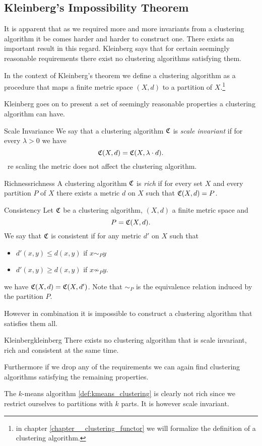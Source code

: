 \subsection[Kleinberg's Impossibility Theorem]{Kleinberg's Impossibility Theorem \cite{Kleinberg2002}}
It is apparent that as we required more and more invariants from a clustering algorithm it be comes harder and harder to construct one.
There exists an important result in this regard. Kleinberg says that for certain seemingly reasonable requirements there exist no clustering algorithms satisfying them.

In the context of Kleinberg's theorem we define a clustering algorithm as a procedure that maps a finite metric space $(X,d)$ to a partition of $X$.\footnote{in chapter \ref{chapter__clustering_functor} we will formalize the definition of a clustering algorithm.}

Kleinberg goes on to present a set of seemingly reasonable properties a clustering algorithm can have.

\begin{definition}{Scale Invariance}{}
We say that a clustering algorithm $\mathfrak{C}$ is \emph{scale invariant} if for every $\lambda > 0$ we have
$$
\mathfrak{C}(X,d) = \mathfrak{C}(X, \lambda \cdot d).
$$
\Ie\ re scaling the metric does not affect the clustering algorithm.
\end{definition}

\begin{definition}{Richness}{richness}
A clustering algorithm $\mathfrak{C}$ is \emph{rich} if for every set $X$ and every partition $P$ of $X$ there exists a metric $d$ on $X$ such that $\mathfrak{C}(X,d) = P$.
\end{definition}

\begin{definition}{Consistency}{}
Let $\mathfrak{C}$ be a clustering algorithm, $(X,d)$ a finite metric space and
$$
P = \mathfrak{C}(X,d).
$$
We say that $\mathfrak{C}$ is consistent if for any metric $d'$ on $X$ such that
\begin{itemize}
    \item $d'(x,y) \leq d(x,y)$ if $x\sim_P y$
    
    \item $d'(x,y) \geq d(x,y)$ if $x \not\sim_P y$.
\end{itemize}
we have $\mathfrak{C}(X,d) = \mathfrak{C}(X,d')$. Note that $\sim_P$ is the equivalence relation induced by the partition $P$.
\end{definition}


However in combination it is impossible to construct a clustering algorithm that satisfies them all.


\begin{theorem}{Kleinberg}{kleinberg}
There exists no clustering algorithm that is scale invariant, rich and consistent at the same time.
\end{theorem}

Furthermore if we drop any of the requirements we can again find clustering algorithms satisfying the remaining properties.

The $k$-means algorithm \ref{def:kmeans_clustering} is clearly not rich since we restrict ourselves to partitions with $k$ parts. It is however scale invariant.

